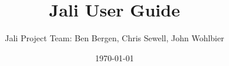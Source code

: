 
\title{Jali User Guide}
\date{\today}
\author{Jali Project Team: Ben Bergen, Chris Sewell, John Wohlbier}

